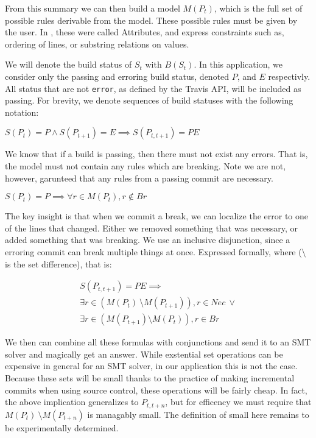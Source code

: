 \documentclass{sigplanconf}
\begin{document}
From this summary we can then build a model $M(P_t)$, which is the full set of possible rules derivable from the model.
These possible rules must be given by the user.
In \cite{CAV}, these were called Attributes, and express constraints such as, ordering of lines, or substring relations on values.

We will denote the build status of $S_t$ with $B(S_t)$.
In this application, we consider only the passing and erroring build status, denoted $P$, and $E$ respectivly.
All status that are not \verb|error|, as defined by the Travis API, will be included as passing.
For brevity, we denote sequences of build statuses with the following notation:

$S(P_t)=P \land S(P_{t+1})=E \implies S(P_{t,t+1}) = PE$

We know that if a build is passing, then there must not exist any errors.
That is, the model must not contain any rules which are breaking.
Note we are not, however, garunteed that any rules from a passing commit are necessary.

$S(P_t)=P \implies \forall r \in M(P_t), r \notin Br$

The key insight is that when we commit a break, we can localize the error to one of the lines that changed.
Either we removed something that was necessary, or added something that was breaking.
We use an inclusive disjunction, since a erroring commit can break multiple things at once.
Expressed formally, where ($\setminus$ is the set difference), that is:

\begin{align*}
  S(P_{t,t+1}) = PE \implies \\
  \exists r \in (M(P_{t})\ \setminus M(P_{t+1})), r \in Nec\ \lor \\
  \exists r \in (M(P_{t+1}) \setminus M(P_{t})), r \in Br
\end{align*}


We then can combine all these formulas with conjunctions and send it to an SMT solver and magically get an answer.
While exstential set operations can be expensive in general for an SMT solver, in our application this is not the case.
Because these sets will be small thanks to the practice of making incremental commits when using source control, these operations will be fairly cheap.
In fact, the above implication generalizes to $P_{t,t+n}$, but for efficency we must require that $M(P_{t})\ \setminus M(P_{t+n})$ is managably small.
The definition of small here remains to be experimentally determined.
\end{document}
